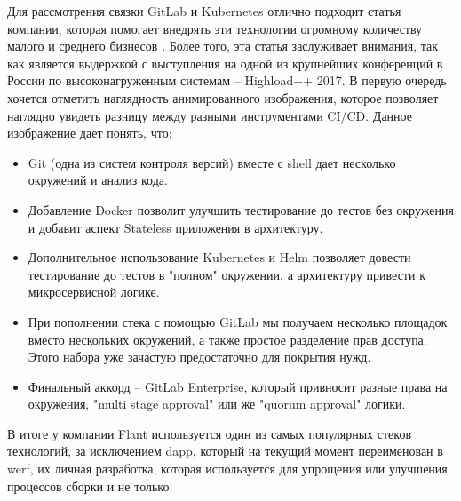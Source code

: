 Для рассмотрения связки GitLab и Kubernetes отлично подходит статья компании, которая помогает внедрять эти технологии огромному количеству малого и среднего бизнесов \cite{habr:flant:k8s-and-gitlab}. Более того, эта статья заслуживает внимания, так как является выдержкой с выступления на одной из крупнейших конференций в России по высоконагруженным системам -- Highload++ 2017. В первую очередь хочется отметить наглядность анимированного изображения, которое позволяет наглядно увидеть разницу между разными инструментами CI/CD.
Данное изображение дает понять, что:
\begin{itemize}
    \item Git (одна из систем контроля версий) \cite{def:git}
        вместе с shell
        дает несколько окружений и анализ кода.
    \item Добавление Docker позволит улучшить тестирование до тестов без окружения и добавит аспект Stateless
        приложения в архитектуру.
    \item Дополнительное использование Kubernetes и Helm позволяет довести тестирование до тестов в "полном" окружении, а архитектуру привести к микросервисной логике.
    \item При пополнении стека с помощью GitLab мы получаем несколько площадок вместо нескольких окружений, а также простое разделение прав доступа. Этого набора уже зачастую предостаточно для покрытия нужд.
    \item Финальный аккорд -- GitLab Enterprise, который привносит разные права на окружения, "multi stage approval"
        или же "quorum approval"
        логики.
\end{itemize}

В итоге у компании Flant используется один из самых популярных стеков технологий, за исключением dapp, который на текущий момент переименован в werf, их личная разработка, которая используется для упрощения или улучшения процессов сборки и не только.

